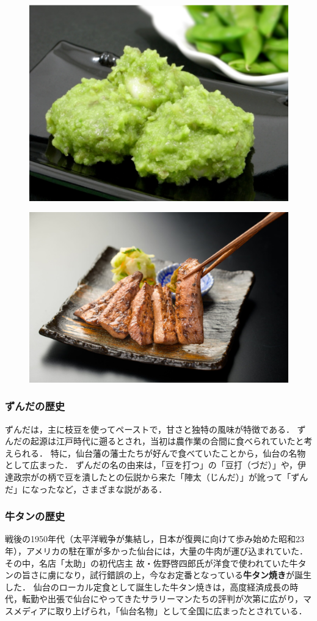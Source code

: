 \begin{figure}[H]
	\centering
	\begin{minipage}[b]{0.49\columnwidth}
		\centering
		\includegraphics[width=0.9\columnwidth]{img/zundamochi.png}
		\label{fig:zundamochi}
	\end{minipage}
	\begin{minipage}[b]{0.49\columnwidth}
		\centering
		\includegraphics[width=0.9\columnwidth]{img/gyutan-yaki.png}
		\label{fig:gyutan-yaki}
	\end{minipage}
\end{figure}

\subsubsection*{ずんだの歴史}
ずんだは，主に枝豆を使ってペーストで，甘さと独特の風味が特徴である．
ずんだの起源は江戸時代に遡るとされ，当初は農作業の合間に食べられていたと考えられる．
特に，仙台藩の藩士たちが好んで食べていたことから，仙台の名物として広まった．
ずんだの名の由来は，「豆を打つ」の「豆打（づだ）」や，伊達政宗がの柄で豆を潰したとの伝説から来た「陣太（じんだ）」が訛って「ずんだ」になったなど，さまざまな説がある．

\subsubsection*{牛タンの歴史}
戦後の1950年代（太平洋戦争が集結し，日本が復興に向けて歩み始めた昭和23年），アメリカの駐在軍が多かった仙台には，大量の牛肉が運び込まれていた．
その中，名店「太助」の初代店主 故・佐野啓四郎氏が洋食で使われていた牛タンの旨さに虜になり，試行錯誤の上，今なお定番となっている\textbf{牛タン焼き}が誕生した．
仙台のローカル定食として誕生した牛タン焼きは，高度経済成長の時代，転勤や出張で仙台にやってきたサラリーマンたちの評判が次第に広がり，マスメディアに取り上げられ，「仙台名物」として全国に広まったとされている．
\newpage
